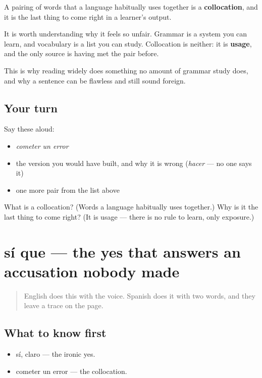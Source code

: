 \begin{grammarlens}[title={What you've built}]
A pairing of words that a language habitually uses together is a \textbf{collocation}, and it is the last thing to come right in a learner's output.

It is worth understanding why it feels so unfair. Grammar is a system you can learn, and vocabulary is a list you can study. Collocation is neither: it is \textbf{usage}, and the only source is having met the pair before.

This is why reading widely does something no amount of grammar study does, and why a sentence can be flawless and still sound foreign.
\end{grammarlens}

\subsection*{Your turn}
Say these aloud:

\begin{itemize}
\raggedright
  \item \emph{cometer un error}
  \item the version you would have built, and why it is wrong (\emph{hacer} — no one says it)
  \item one more pair from the list above
\end{itemize}

\begin{tcolorbox}[breakable,colback=teal!4,colframe=teal!35!black,title={Before you move on}]
What is a collocation? (Words a language habitually uses together.) Why is it the last thing to come right? (It is usage — there is no rule to learn, only exposure.)
\end{tcolorbox}
\section[sí que]{sí que — the yes that answers an accusation nobody made}

\label{lesson:ES-C275-si-que}



\begin{quote}
English does this with the voice. Spanish does it with two words, and they leave a trace on the page.
\end{quote}

\subsection*{What to know first}
\begin{itemize}
\raggedright
  \item sí, claro — the ironic yes.
  \item cometer un error — the collocation.
\end{itemize}

